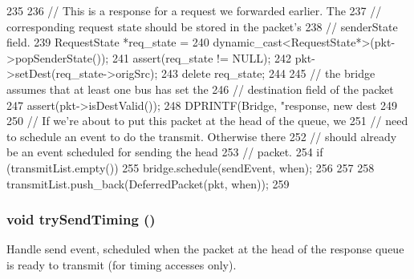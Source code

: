 \begin{DoxyCode}
235 {
236     // This is a response for a request we forwarded earlier.  The
237     // corresponding request state should be stored in the packet's
238     // senderState field.
239     RequestState *req_state =
240         dynamic_cast<RequestState*>(pkt->popSenderState());
241     assert(req_state != NULL);
242     pkt->setDest(req_state->origSrc);
243     delete req_state;
244 
245     // the bridge assumes that at least one bus has set the
246     // destination field of the packet
247     assert(pkt->isDestValid());
248     DPRINTF(Bridge, "response, new dest %
249 
250     // If we're about to put this packet at the head of the queue, we
251     // need to schedule an event to do the transmit.  Otherwise there
252     // should already be an event scheduled for sending the head
253     // packet.
254     if (transmitList.empty()) {
255         bridge.schedule(sendEvent, when);
256     }
257 
258     transmitList.push_back(DeferredPacket(pkt, when));
259 }
\end{DoxyCode}
\hypertarget{classBridge_1_1BridgeSlavePort_a391c414b53eb45782e37bc539608e477}{
\subsubsection[{trySendTiming}]{\setlength{\rightskip}{0pt plus 5cm}void trySendTiming ()}}
\label{classBridge_1_1BridgeSlavePort_a391c414b53eb45782e37bc539608e477}
Handle send event, scheduled when the packet at the head of the response queue is ready to transmit (for timing accesses only). 


